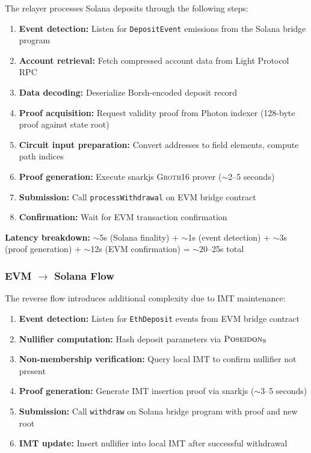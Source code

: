 \documentclass[11pt,a4paper,twoside]{article}
\newcommand{\poseidon}{\textsc{Poseidon}}
\newcommand{\groth}{\textsc{Groth16}}
\begin{document}
The relayer processes Solana deposits through the following steps:
\begin{enumerate}
    \item \textbf{Event detection:} Listen for \texttt{DepositEvent} emissions from the Solana bridge program
    \item \textbf{Account retrieval:} Fetch compressed account data from Light Protocol RPC
    \item \textbf{Data decoding:} Deserialize Borsh-encoded deposit record
    \item \textbf{Proof acquisition:} Request validity proof from Photon indexer (128-byte proof against state root)
    \item \textbf{Circuit input preparation:} Convert addresses to field elements, compute path indices
    \item \textbf{Proof generation:} Execute snarkjs \groth{} prover ($\sim$2--5 seconds)
    \item \textbf{Submission:} Call \texttt{processWithdrawal} on EVM bridge contract
    \item \textbf{Confirmation:} Wait for EVM transaction confirmation
\end{enumerate}

\textbf{Latency breakdown:} $\sim$5s (Solana finality) + $\sim$1s (event detection) + $\sim$3s (proof generation) + $\sim$12s (EVM confirmation) = $\sim$20--25s total

\subsubsection{EVM $\rightarrow$ Solana Flow}

The reverse flow introduces additional complexity due to IMT maintenance:
\begin{enumerate}
    \item \textbf{Event detection:} Listen for \texttt{EthDeposit} events from EVM bridge contract
    \item \textbf{Nullifier computation:} Hash deposit parameters via $\poseidon_9$
    \item \textbf{Non-membership verification:} Query local IMT to confirm nullifier not present
    \item \textbf{Proof generation:} Generate IMT insertion proof via snarkjs ($\sim$3--5 seconds)
    \item \textbf{Submission:} Call \texttt{withdraw} on Solana bridge program with proof and new root
    \item \textbf{IMT update:} Insert nullifier into local IMT after successful withdrawal
\end{enumerate}
\end{document}
